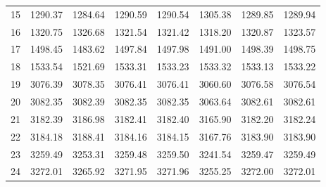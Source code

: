 \documentclass[10pt,oneside]{article}
\begin{document}
\begin{table}[h!]
\begin{tabular}{cccccccc}
15 &   1290.37 & 1284.64 & 1290.59 &    1290.54 &      1305.38 & 1289.85 &   1289.94 \\
16 &   1320.75 & 1326.68 & 1321.54 &    1321.42 &      1318.20 & 1320.87 &   1323.57 \\
17 &   1498.45 & 1483.62 & 1497.84 &    1497.98 &      1491.00 & 1498.39 &   1498.75 \\
18 &   1533.54 & 1521.69 & 1533.31 &    1533.23 &      1533.32 & 1533.13 &   1533.22 \\
19 &   3076.39 & 3078.35 & 3076.41 &    3076.41 &      3060.60 & 3076.58 &   3076.54 \\
20 &   3082.35 & 3082.39 & 3082.35 &    3082.35 &      3063.64 & 3082.61 &   3082.61 \\
21 &   3182.39 & 3186.98 & 3182.41 &    3182.40 &      3165.90 & 3182.20 &   3182.24 \\
22 &   3184.18 & 3188.41 & 3184.16 &    3184.15 &      3167.76 & 3183.90 &   3183.90 \\
23 &   3259.49 & 3253.31 & 3259.48 &    3259.50 &      3241.54 & 3259.47 &   3259.49 \\
24 &   3272.01 & 3265.92 & 3271.95 &    3271.96 &      3255.25 & 3272.00 &   3272.01 \\
\bottomrule
\end{tabular}
\end{table}
\end{document}
